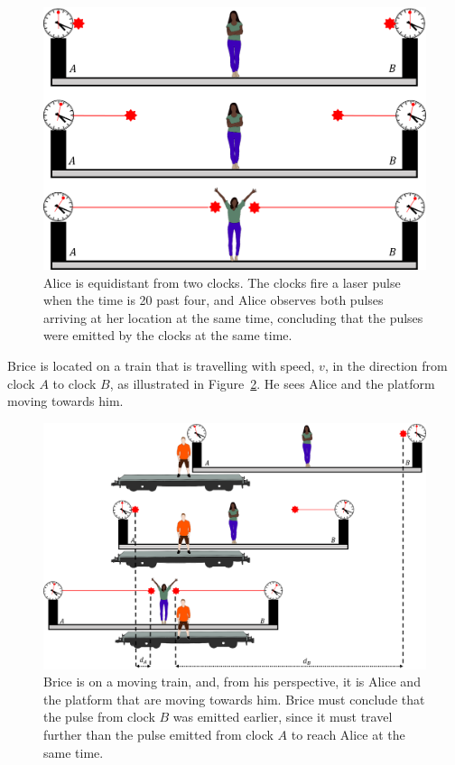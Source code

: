 \begin{figure}[!htbp]
\centering
\includegraphics[width=0.7\linewidth]{files/platform_rest-b420067c83cb3647a868c3bff6795c0d.png}
\caption[]{Alice is equidistant from two clocks. The clocks fire a laser pulse when the time is 20 past four, and Alice observes both pulses arriving at her location at the same time, concluding that the pulses were emitted by the clocks at the same time.}
\label{fig:specialrelativity:platform_rest}
\end{figure}

Brice is located on a train that is travelling with speed, $v$, in the direction from clock $A$ to clock $B$, as illustrated in Figure~\ref{fig:specialrelativity:platform_moving}. He sees Alice and the platform moving towards him.

\begin{figure}[!htbp]
\centering
\includegraphics[width=0.8\linewidth]{files/platform_moving-73adb17069939401ece5c1c52eb63fba.png}
\caption[]{Brice is on a moving train, and, from his perspective, it is Alice and the platform that are moving towards him. Brice must conclude that the pulse from clock $B$ was emitted earlier, since it must travel further than the pulse emitted from clock $A$ to reach Alice at the same time.}
\label{fig:specialrelativity:platform_moving}
\end{figure}

